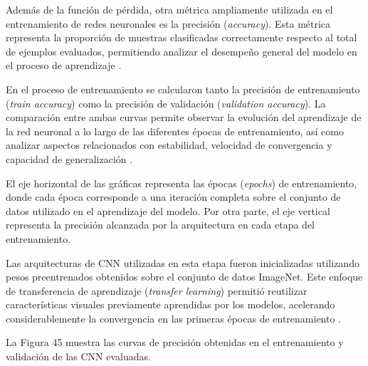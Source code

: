 	Además de la función de pérdida, otra métrica ampliamente utilizada en el entrenamiento de redes neuronales es la precisión (\textit{accuracy}). Esta métrica representa la proporción de muestras clasificadas correctamente respecto al total de ejemplos evaluados, permitiendo analizar el desempeño general del modelo en el proceso de aprendizaje \cite{goodfellow2016deep,geron2022hands}.
	
	En el proceso de entrenamiento se calcularon tanto la precisión de entrenamiento (\textit{train accuracy}) como la precisión de validación (\textit{validation accuracy}). La comparación entre ambas curvas permite observar la evolución del aprendizaje de la red neuronal a lo largo de las diferentes épocas de entrenamiento, así como analizar aspectos relacionados con estabilidad, velocidad de convergencia y capacidad de generalización \cite{chollet2021deep}.
	
	El eje horizontal de las gráficas representa las épocas (\textit{epochs}) de entrenamiento, donde cada época corresponde a una iteración completa sobre el conjunto de datos utilizado en el aprendizaje del modelo. Por otra parte, el eje vertical representa la precisión alcanzada por la arquitectura en cada etapa del entrenamiento.
	
	Las arquitecturas de CNN utilizadas en esta etapa fueron inicializadas utilizando pesos preentrenados obtenidos sobre el conjunto de datos ImageNet. Este enfoque de transferencia de aprendizaje (\textit{transfer learning}) permitió reutilizar características visuales previamente aprendidas por los modelos, acelerando considerablemente la convergencia en las primeras épocas de entrenamiento \cite{chollet2021deep,geron2022hands}.
	
	
	
	La Figura 45 muestra las curvas de precisión obtenidas en el entrenamiento y validación de las CNN evaluadas.
	
